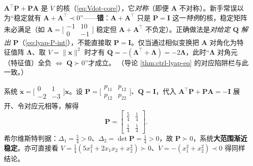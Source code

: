 \begin{pitfall}
$\mathbf{A}^\top\mathbf{P}+\mathbf{P}\mathbf{A}$ 是 $\dot V$ 的核（\cref{eq:Vdot-core}），它\emph{对称}（即便 $\mathbf{A}$ 不对称）。新手常误以为“稳定就有 $\mathbf{A}+\mathbf{A}^\top\prec0$”——\textbf{错}：$\mathbf{A}+\mathbf{A}^\top$ 只是 $\mathbf{P}=\mathbf{I}$ 这一\emph{特例}的核，稳定矩阵未必满足（如 $\mathbf{A}=\big[\begin{smallmatrix}-1&10\\0&-1\end{smallmatrix}\big]$ 稳定但 $\mathbf{A}+\mathbf{A}^\top$ 不负定）。正确做法是\emph{对给定 $\mathbf{Q}$ 解出 $\mathbf{P}$}（\cref{eq:lyap-P-int}），不能直接取 $\mathbf{P}=\mathbf{I}$。仅当通过相似变换把 $\mathbf{A}$ 对角化为特征值阵 $\boldsymbol\Lambda$、取 $V=\|\mathbf{x}\|^2$ 时才有 $\mathbf{Q}=-(\boldsymbol\Lambda^\top+\boldsymbol\Lambda)=-2\boldsymbol\Lambda$，此时“$\boldsymbol\Lambda$ 对角元（特征值）全负 $\iff$ $\mathbf{Q}\succ0$”才成立。%
（导论 \cref{thm:ctrl-lyap-eq} 的对应陷阱栏与此一致。）
\end{pitfall}

\begin{example}[$\mathbf{Q}=\mathbf{I}$ 解 $\mathbf{P}$ 判稳定]\label{ex:lyap-solve-P}
系统 $\dot{\mathbf{x}}=\big[\begin{smallmatrix}0&1\\-2&-3\end{smallmatrix}\big]\mathbf{x}$。设 $\mathbf{P}=\big[\begin{smallmatrix}p_{11}&p_{12}\\p_{12}&p_{22}\end{smallmatrix}\big]$、$\mathbf{Q}=\mathbf{I}$，代入 $\mathbf{A}^\top\mathbf{P}+\mathbf{P}\mathbf{A}=-\mathbf{I}$ 展开、令对应元相等，解得
\[
  \mathbf{P}=\begin{bmatrix}\tfrac54&\tfrac14\\[2pt]\tfrac14&\tfrac14\end{bmatrix}.
\]
希尔维斯特判据：$\Delta_1=\tfrac54>0$、$\Delta_2=\det\mathbf{P}=\tfrac14>0$，故 $\mathbf{P}\succ0$，系统\textbf{大范围渐近稳定}。亦可直接看 $V=\tfrac14(5x_1^2+2x_1x_2+x_2^2)\succ0$、$\dot V=-(x_1^2+x_2^2)\prec0$ 得同样结论。
\end{example}

